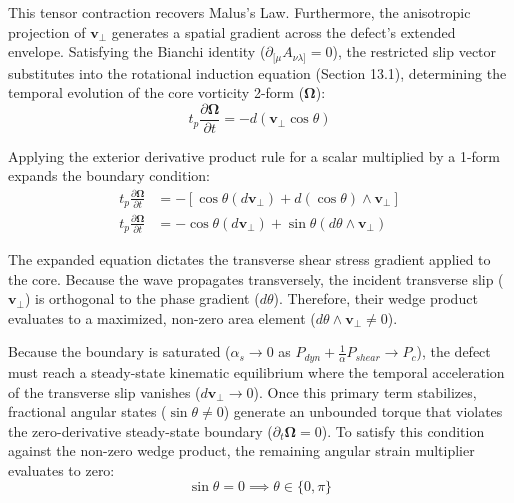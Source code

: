 This tensor contraction recovers Malus's Law. Furthermore, the anisotropic projection of $\mathbf{v}_\perp$ generates a spatial gradient across the defect's extended envelope. Satisfying the Bianchi identity ($\partial_{[\mu} A_{\nu\lambda]} = 0$), the restricted slip vector substitutes into the rotational induction equation (Section 13.1), determining the temporal evolution of the core vorticity 2-form ($\boldsymbol{\Omega}$): %
\begin{equation}
    t_p \frac{\partial \boldsymbol{\Omega}}{\partial t} = - d \left( \mathbf{v}_\perp \cos\theta \right) \label{eq:measurement_torque}
\end{equation}

Applying the exterior derivative product rule for a scalar multiplied by a 1-form expands the boundary condition: %
\begin{align}
    t_p \frac{\partial \boldsymbol{\Omega}}{\partial t} &= - \left[ \cos\theta (d\mathbf{v}_\perp) + d(\cos\theta) \wedge \mathbf{v}_\perp \right] \nonumber \\
    t_p \frac{\partial \boldsymbol{\Omega}}{\partial t} &= - \cos\theta (d\mathbf{v}_\perp) + \sin\theta (d\theta \wedge \mathbf{v}_\perp) \label{eq:expanded_torque}
\end{align}

The expanded equation dictates the transverse shear stress gradient applied to the core. Because the wave propagates transversely, the incident transverse slip ($\mathbf{v}_\perp$) is orthogonal to the phase gradient ($d\theta$). Therefore, their wedge product evaluates to a maximized, non-zero area element ($d\theta \wedge \mathbf{v}_\perp \neq 0$). 

Because the boundary is saturated ($\alpha_s \to 0$ as $P_{dyn} + \frac{1}{\alpha}P_{shear} \to P_c$), the defect must reach a steady-state kinematic equilibrium where the temporal acceleration of the transverse slip vanishes ($d\mathbf{v}_\perp \to 0$). Once this primary term stabilizes, fractional angular states ($\sin\theta \neq 0$) generate an unbounded torque that violates the zero-derivative steady-state boundary ($\partial_t \boldsymbol{\Omega} = 0$). To satisfy this condition against the non-zero wedge product, the remaining angular strain multiplier evaluates to zero: %
\begin{equation}
    \sin\theta = 0 \implies \theta \in \{0, \pi\}
\end{equation}

